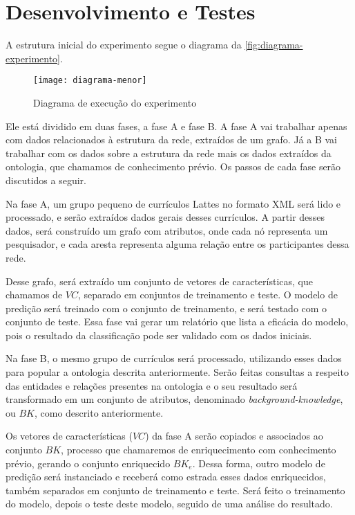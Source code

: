 \section{Desenvolvimento e Testes}
\label{sec:desenvolvimento-testes}

A estrutura inicial do experimento segue o diagrama da \autoref{fig:diagrama-experimento}.

\begin{figure}[!h]
  \centering
  \texttt{[image: diagrama-menor]}
  \caption{Diagrama de execução do experimento}
  \label{fig:diagrama-experimento}
\end{figure}

Ele está dividido em duas fases, a fase A e fase B. A fase A vai trabalhar apenas com dados relacionados à estrutura da rede, extraídos de um grafo. Já a B vai trabalhar com os dados sobre a estrutura da rede mais os dados extraídos da ontologia, que chamamos de conhecimento prévio. Os passos de cada fase serão discutidos a seguir.

Na fase A, um grupo pequeno de currículos Lattes no formato XML será lido e processado, e serão extraídos dados gerais desses currículos. A partir desses dados, será construído um grafo com atributos, onde cada nó representa um pesquisador, e cada aresta representa alguma relação entre os participantes dessa rede.

Desse grafo, será extraído um conjunto de vetores de características, que chamamos de $VC$, separado em conjuntos de treinamento e teste. O modelo de predição será treinado com o conjunto de treinamento, e será testado com o conjunto de teste. Essa fase vai gerar um relatório que lista a eficácia do modelo, pois o resultado da classificação pode ser validado com os dados iniciais.

Na fase B, o mesmo grupo de currículos será processado, utilizando esses dados para popular a ontologia descrita anteriormente. Serão feitas consultas a respeito das entidades e relações presentes na ontologia e o seu resultado será transformado em um conjunto de atributos, denominado \textit{background-knowledge}, ou $BK$, como descrito anteriormente.

Os vetores de características ($VC$) da fase A serão copiados e associados ao conjunto $BK$, processo que chamaremos de enriquecimento com conhecimento prévio, gerando o conjunto enriquecido $BK_e$. Dessa forma, outro modelo de predição será instanciado e receberá como estrada esses dados enriquecidos, também separados em conjunto de treinamento e teste. Será feito o treinamento do modelo, depois o teste deste modelo, seguido de uma análise do resultado.

